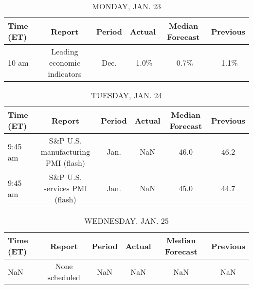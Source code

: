 \documentclass{article}%
\begin{document}
%
\normalsize%


\begin{table}[htbp]%
\caption{MONDAY, JAN. 23}%
\centering%
\begin{adjustbox}{width=1\textwidth}%
\begin{tabular}{lccccc}
\toprule
Time (ET) &                      Report & Period & Actual & Median Forecast & Previous \\
\midrule
    10 am & Leading economic indicators &   Dec. &  -1.0\% &           -0.7\% &    -1.1\% \\
\bottomrule
\end{tabular}
%
\end{adjustbox}%
\end{table}

%


\begin{table}[htbp]%
\caption{TUESDAY, JAN. 24}%
\centering%
\begin{adjustbox}{width=1\textwidth}%
\begin{tabular}{lccccc}
\toprule
Time (ET) &                             Report & Period & Actual & Median Forecast & Previous \\
\midrule
  9:45 am & S\&P U.S. manufacturing PMI (flash) &   Jan. &    NaN &            46.0 &     46.2 \\
  9:45 am &      S\&P U.S. services PMI (flash) &   Jan. &    NaN &            45.0 &     44.7 \\
\bottomrule
\end{tabular}
%
\end{adjustbox}%
\end{table}

%


\begin{table}[htbp]%
\caption{WEDNESDAY, JAN. 25}%
\centering%
\begin{adjustbox}{width=1\textwidth}%
\begin{tabular}{lccccc}
\toprule
Time (ET) &         Report & Period & Actual & Median Forecast & Previous \\
\midrule
      NaN & None scheduled &    NaN &    NaN &             NaN &      NaN \\
\bottomrule
\end{tabular}
%
\end{adjustbox}%
\end{table}

%
\end{document}
